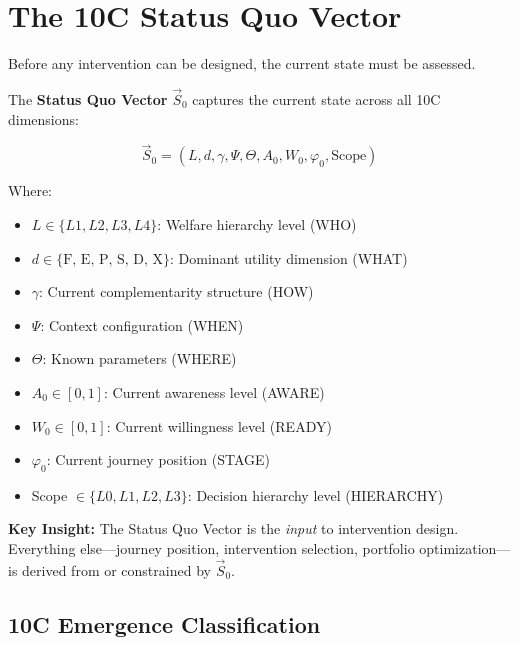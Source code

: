 \section{The 10C Status Quo Vector}
\label{sec:ie-status-quo}

Before any intervention can be designed, the current state must be assessed.

\begin{tcolorbox}[colback=blue!5!white, colframe=blue!75!black,
    title=\textbf{Definition IE-D0: The 10C Status Quo Vector}]

The \textbf{Status Quo Vector} $\vec{S}_0$ captures the current state across all 10C dimensions:

\begin{equation}
\boxed{\vec{S}_0 = (L, d, \gamma, \Psi, \Theta, A_0, W_0, \varphi_0, \text{Scope})}
\label{eq:ie-status-quo}
\end{equation}

Where:
\begin{itemize}[nosep]
\item $L \in \{L1, L2, L3, L4\}$: Welfare hierarchy level (WHO)
\item $d \in \{\text{F, E, P, S, D, X}\}$: Dominant utility dimension (WHAT)
\item $\gamma$: Current complementarity structure (HOW)
\item $\Psi$: Context configuration (WHEN)
\item $\Theta$: Known parameters (WHERE)
\item $A_0 \in [0,1]$: Current awareness level (AWARE)
\item $W_0 \in [0,1]$: Current willingness level (READY)
\item $\varphi_0$: Current journey position (STAGE)
\item Scope $\in \{L0, L1, L2, L3\}$: Decision hierarchy level (HIERARCHY)
\end{itemize}

\end{tcolorbox}

\textbf{Key Insight:} The Status Quo Vector is the \textit{input} to intervention design. Everything else---journey position, intervention selection, portfolio optimization---is derived from or constrained by $\vec{S}_0$.

\subsection{10C Emergence Classification}
\label{sec:ie-9c-emergence}

